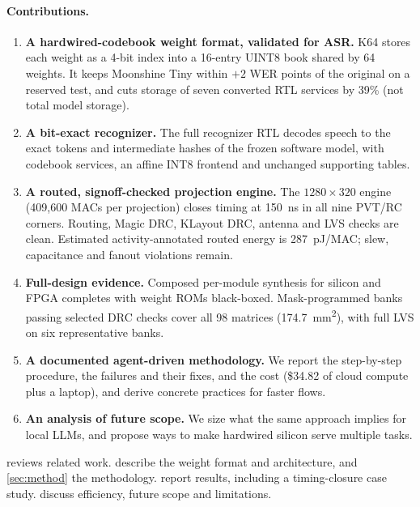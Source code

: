 \paragraph{Contributions.}
\begin{enumerate}
\item \textbf{A hardwired-codebook weight format, validated for ASR.} K64 stores each weight as a 4-bit index into a 16-entry UINT8 book shared by 64 weights. It keeps Moonshine Tiny within $+2$ WER points of the original on a reserved test, and cuts storage of seven converted RTL services by 39\% (not total model storage).
\item \textbf{A bit-exact recognizer.} The full recognizer RTL decodes speech to the exact tokens and intermediate hashes of the frozen software model, with codebook services, an affine INT8 frontend and unchanged supporting tables.
\item \textbf{A routed, signoff-checked projection engine.} The $1280\times320$ engine (409,600 MACs per projection) closes timing at \SI{150}{ns} in all nine PVT/RC corners. Routing, Magic DRC, KLayout DRC, antenna and LVS checks are clean. Estimated activity-annotated routed energy is \SI{287}{pJ}/MAC; slew, capacitance and fanout violations remain.
\item \textbf{Full-design evidence.} Composed per-module synthesis for silicon and FPGA completes with weight ROMs black-boxed. Mask-programmed banks passing selected DRC checks cover all 98 matrices (\SI{174.7}{mm^2}), with full LVS on six representative banks.
\item \textbf{A documented agent-driven methodology.} We report the step-by-step procedure, the failures and their fixes, and the cost (\$34.82 of cloud compute plus a laptop), and derive concrete practices for faster flows.
\item \textbf{An analysis of future scope.} We size what the same approach implies for local LLMs, and propose ways to make hardwired silicon serve multiple tasks.
\end{enumerate}

 reviews related work.  describe the weight format and architecture, and \cref{sec:method} the methodology.  report results, including a timing-closure case study.  discuss efficiency, future scope and limitations.
